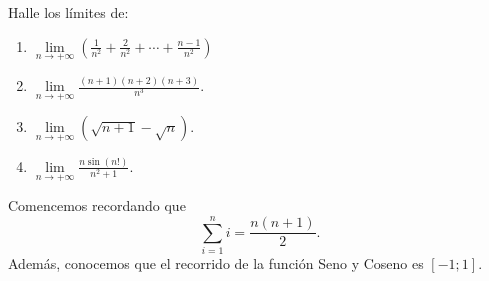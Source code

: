 
	\begin{exercise}
		Halle los l\'imites de:
		\begin{enumerate}
			\item \(\lim\limits_{n\to+\infty}\left(\frac{1}{n^2}+\frac{2}{n^2}+\cdots+\frac{n-1}{n^2}\right)\)
			\item \(\lim\limits_{n\to+\infty}{\frac{(n+1)(n+2)(n+3)}{n^3}}.\)
			\item \(\lim\limits_{n\to+\infty}{\left(\sqrt{n+1}-\sqrt{n}\right).}\)
			\item \(\lim\limits_{n\to+\infty}{\frac{n\sin(n!)}{n^2+1}}.\)
		\end{enumerate}
	\end{exercise}
	Comencemos recordando que
	\[\displaystyle\sum_{i=1}^{n}{i}=\dfrac{n(n+1)}{2}.\]
	Adem\'as, conocemos que el recorrido de la funci\'on Seno y Coseno es \([-1;1].\)
	
